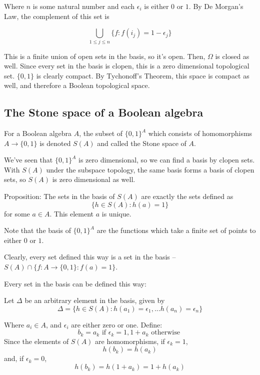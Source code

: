 \documentclass{article}
\begin{document}
        Where $n$ is some natural number and each $\epsilon_i$ is either $0$ or
        $1$. By De Morgan's Law, the complement of this set is

        \[\bigcup_{1 \leq j \leq n} \{f : f(i_j) = 1 - \epsilon_j\}\]

        This is a finite union of open sets in the basis, so it's open. Then,
        $\Omega$ is closed as well. Since every set in the basis is clopen, this
        is a zero dimensional topological set. $\{0,1\}$ is clearly compact. By
        Tychonoff's Theorem, this space is compact as well, and therefore a
        Boolean topological space.

    \subsection{The Stone space of a Boolean algebra}

      For a Boolean algebra $A$, the subset of $\{0,1\}^A$ which consists of
      homomorphisms $A \rightarrow \{0,1\}$ is denoted $S(A)$ and called the
      Stone space of $A$.

      We've seen that $\{0,1\}^A$ is zero dimensional, so we can find a basis by
      clopen sets. With $S(A)$ under the subspace topology, the same basis forms
      a basis of clopen sets, so $S(A)$ is zero dimensional as well.

      Proposition: The sets in the basis of $S(A)$ are exactly the sets defined
      as
      \[\{h\in S(A): h(a) = 1\}\]
      for some $a \in A$. This element $a$ is unique.

      Note that the basis of $\{0,1\}^A$ are the functions which take a finite
      set of points to either $0$ or $1$.

      Clearly, every set defined this way is a set in the basis -- $S(A) \cap
      \{f: A \rightarrow \{0,1\} : f(a) = 1\}$.

      Every set in the basis can be defined this way:

      Let $\Delta$ be an arbitrary element in the basis, given by
      \[\Delta = \{h \in S(A) : h(a_1) = \epsilon_1, ... h(a_n) = \epsilon_n\}\]

      Where $a_i \in A$, and $\epsilon_i$ are either zero or one. Define:
      \[b_k = a_k \text{ if } \epsilon_k = 1, 1+a_k \text{ otherwise }\]
      Since the elements of $S(A)$ are homomorphisms, if $\epsilon_k = 1$,
      \[h(b_k) = h(a_k)\]
      and, if $\epsilon_k = 0$,
      \[h(b_k) = h(1+a_k) = 1+h(a_k)\]
\end{document}
